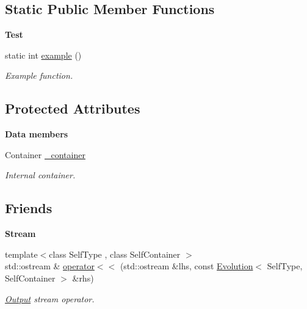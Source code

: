 \subsection*{Static Public Member Functions}
\begin{Indent}{\bf Test}\par
\begin{DoxyCompactItemize}
\item 
static int \hyperlink{exceptionmagrathea_1_1Evolution_afea9bf1e458395e18516cc1f28bf5fb6}{example} ()
\begin{DoxyCompactList}\small\item\em Example function. \end{DoxyCompactList}\end{DoxyCompactItemize}
\end{Indent}
\subsection*{Protected Attributes}
\begin{Indent}{\bf Data members}\par
\begin{DoxyCompactItemize}
\item 
Container \hyperlink{exceptionmagrathea_1_1Evolution_a0e5a30f6e53360808894c2b28a0b0acf}{\-\_\-container}
\begin{DoxyCompactList}\small\item\em Internal container. \end{DoxyCompactList}\end{DoxyCompactItemize}
\end{Indent}
\subsection*{Friends}
\begin{Indent}{\bf Stream}\par
\begin{DoxyCompactItemize}
\item 
{\footnotesize template$<$class Self\-Type , class Self\-Container $>$ }\\std\-::ostream \& \hyperlink{exceptionmagrathea_1_1Evolution_af542714eb03c50e30999005317e37e29}{operator$<$$<$} (std\-::ostream \&lhs, const \hyperlink{exceptionmagrathea_1_1Evolution}{Evolution}$<$ Self\-Type, Self\-Container $>$ \&rhs)
\begin{DoxyCompactList}\small\item\em \hyperlink{exceptionOutput}{Output} stream operator. \end{DoxyCompactList}\end{DoxyCompactItemize}
\end{Indent}


